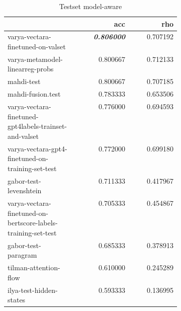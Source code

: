 \begin{table}
\caption{Testset model-aware}
\label{test-aware}
\begin{tabular}{|p{0.4\linewidth}|r|r|}
\hline
 & acc & rho \\
\hline
varya-vectara-finetuned-on-valset & \textit{\textbf{0.806000}} & 0.707192 \\
\cline{1-3}
varya-metamodel-linearreg-probs & 0.800667 & 0.712133 \\
\cline{1-3}
mahdi-test & 0.800667 & 0.707185 \\
\cline{1-3}
mahdi-fusion.test & 0.783333 & 0.653506 \\
\cline{1-3}
varya-vectara-finetuned-gpt4labels-trainset-and-valset & 0.776000 & 0.694593 \\
\cline{1-3}
varya-vectara-gpt4-finetuned-on-training-set-test & 0.772000 & 0.699180 \\
\cline{1-3}
gabor-test-levenshtein & 0.711333 & 0.417967 \\
\cline{1-3}
varya-vectara-finetuned-on-bertscore-labels-training-set-test & 0.705333 & 0.454867 \\
\cline{1-3}
gabor-test-paragram & 0.685333 & 0.378913 \\
\cline{1-3}
tilman-attention-flow & 0.610000 & 0.245289 \\
\cline{1-3}
ilya-test-hidden-states & 0.593333 & 0.136995 \\
\cline{1-3}
\hline
\end{tabular}
\end{table}
